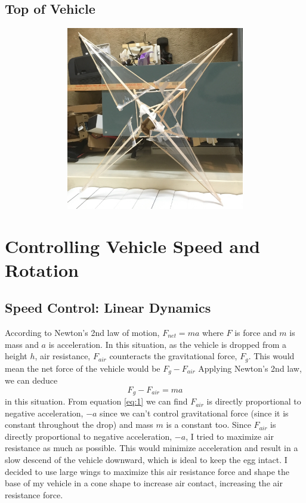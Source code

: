 \documentclass[12pt]{report}
\begin{document}
\section{Top of Vehicle}
\includegraphics[width=15cm, height=8cm]{top}


\chapter{Controlling Vehicle Speed and Rotation}



\section{Speed Control: Linear Dynamics}

\qquad According to Newton's 2nd law of motion, $F_{net} = ma$ where $F$ is force and $m$ is mass and $a$ is acceleration. In this situation, as the vehicle is dropped from a height $h$, air resistance, $ F_{air} $ counteracts the gravitational force, $ F_{g} $. This would mean the net force of the vehicle would be $F_{g} - F_{air}$
Applying Newton's 2nd law, we can deduce
\begin{equation} \label{eq:1}
F_{g} - F_{air} = ma
\end{equation}
 in this situation. From equation \ref{eq:1} we can find $F_{air}$ is directly proportional to negative acceleration, $-a$ since we can't control gravitational force (since it is constant throughout the drop) and mass $m$ is a constant too.
 Since $F_{air}$ is directly proportional to negative acceleration, $-a$, I tried to maximize air resistance as much as possible. This would minimize acceleration and result in a slow descend of the vehicle downward, which is ideal to keep the egg intact. I decided to use large wings to maximize this air resistance force and shape the base of my vehicle in a cone shape to increase air contact, increasing the air resistance force.
\end{document}
